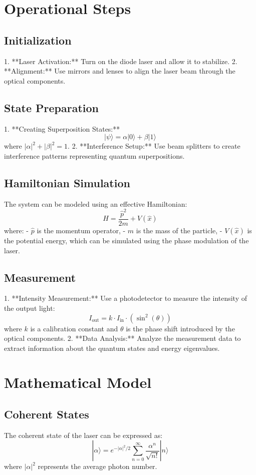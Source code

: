 \documentclass{article}
\begin{document}
\section{Operational Steps}

\subsection{Initialization}
1. **Laser Activation:** Turn on the diode laser and allow it to stabilize.
2. **Alignment:** Use mirrors and lenses to align the laser beam through the optical components.

\subsection{State Preparation}
1. **Creating Superposition States:**
   \[
   |\psi\rangle = \alpha |0\rangle + \beta |1\rangle
   \]
   where \(|\alpha|^2 + |\beta|^2 = 1\).
2. **Interference Setup:** Use beam splitters to create interference patterns representing quantum superpositions.

\subsection{Hamiltonian Simulation}
The system can be modeled using an effective Hamiltonian:
\[
H = \frac{\hat{p}^2}{2m} + V(\hat{x})
\]
where:
- \(\hat{p}\) is the momentum operator,
- \(m\) is the mass of the particle,
- \(V(\hat{x})\) is the potential energy, which can be simulated using the phase modulation of the laser.

\subsection{Measurement}
1. **Intensity Measurement:** Use a photodetector to measure the intensity of the output light:
   \[
   I_{\text{out}} = k \cdot I_{\text{in}} \cdot \left( \sin^2(\theta) \right)
   \]
   where \(k\) is a calibration constant and \(\theta\) is the phase shift introduced by the optical components.
2. **Data Analysis:** Analyze the measurement data to extract information about the quantum states and energy eigenvalues.

\section{Mathematical Model}

\subsection{Coherent States}
The coherent state of the laser can be expressed as:
\[
|\alpha\rangle = e^{-|\alpha|^2/2} \sum_{n=0}^{\infty} \frac{\alpha^n}{\sqrt{n!}} |n\rangle
\]
where \(|\alpha|^2\) represents the average photon number.
\end{document}
